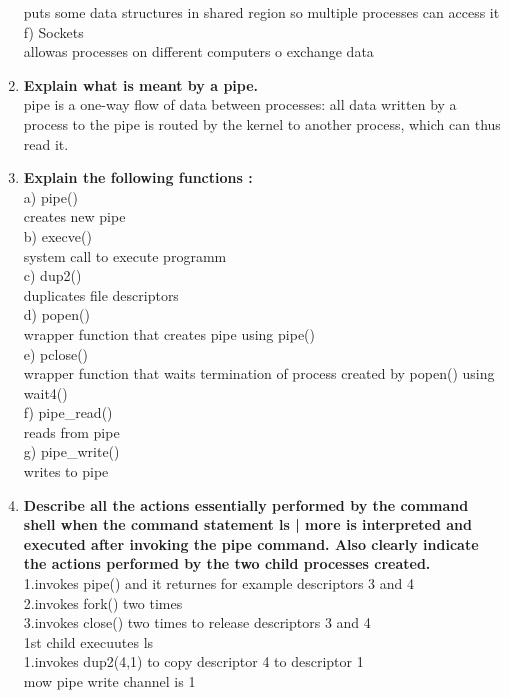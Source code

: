 \documentclass[a4paper,12pt]{article}
\begin{document}
\begin{flushleft}
\begin{enumerate}
{\color{red}puts some data structures in shared region so multiple processes can access it}\\
f) Sockets\\
{\color{red} allowas processes on different computers o exchange data}\\
\item \textbf{ Explain what is meant by a pipe.}\\
{\color{red}pipe is a one-way flow of data between processes: all data written by a process to the pipe is
routed by the kernel to another process, which can thus read it.}\\
\item \textbf{ Explain the following functions :}\\
a) pipe()\\
{\color{red}creates new pipe}\\
 b) execve() \\
 {\color{red}system call to execute programm}\\
c) dup2()\\
{\color{red}duplicates file descriptors}\\
 d) popen() \\
 {\color{red}wrapper function that creates  pipe using pipe()}\\
e) pclose()\\
 {\color{red}wrapper function that waits termination of process created by popen() using wait4()}\\
f) pipe\_read()\\
{\color{red}reads from pipe}\\
g) pipe\_write()\\
{\color{red}writes to pipe}\\
\item \textbf{ Describe all the actions essentially performed by the command shell when the command statement ls | more is interpreted and executed after invoking the pipe command. Also clearly indicate the actions performed by the two child processes created.}\\
{\color{red}1.invokes pipe() and it returnes for example descriptors 3 and 4\\
2.invokes fork() two times\\
3.invokes close() two times to release descriptors 3 and 4\\
1st child execuutes ls\\
1.invokes dup2(4,1) to copy descriptor 4 to descriptor 1\\
mow pipe write channel is 1\\
}
\end{enumerate}
\end{flushleft}
\end{document}
